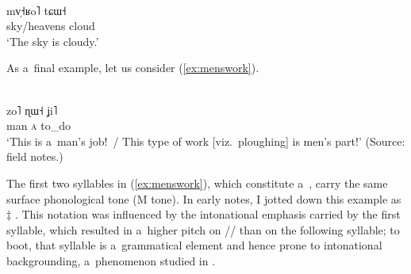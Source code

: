 \begin{exe}
	\ex
	\label{ex:cloudy}
	\\ 
	\gll mv̩˧ʁo˥	tɕɯ˧\\
	sky/heavens		cloud\\
	\glt ‘The sky is cloudy.’	
\end{exe}

As a~final example, let us consider (\ref{ex:menswork}). 

\begin{exe}
	\ex
	\label{ex:menswork}
	\\ 
	\gll zo˥		ɳɯ˧		ʝi˥\\
	man			\textsc{a}	to\_do\\
	\glt ‘This is a~man’s job!~/ This type of work [viz.\ ploughing] is
	men’s part!’ (Source: field notes.)
\end{exe}

The first two syllables in (\ref{ex:menswork}), which constitute a~, carry the same
surface phonological tone (M tone). In early notes, I jotted down this example as $\ddagger${\kern2pt} . This notation was influenced by the intonational emphasis
carried by the first syllable, which resulted in a~higher pitch on // than on the
following syllable; to boot, that syllable is a~grammatical element and hence prone to intonational
backgrounding, a~phenomenon studied in .

